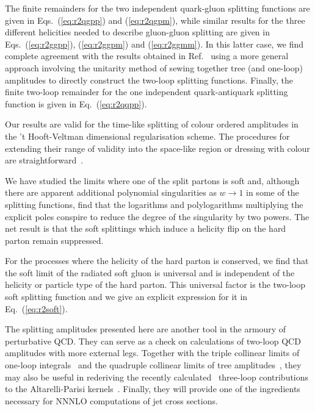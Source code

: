 \documentclass[paper,notoc,nohyper]{JHEP3}
\begin{document}
The finite remainders for the two independent quark-gluon splitting functions
are given in Eqs.~(\ref{eq:r2qgpp}) and (\ref{eq:r2qgpm}), while similar
results for the three different helicities needed to describe gluon-gluon
splitting  are given in Eqs.~(\ref{eq:r2ggpp}), (\ref{eq:r2ggpm}) and
(\ref{eq:r2ggmm}).  In this latter case, we find complete agreement with the
results obtained in Ref.~\cite{Bern:2lsplit} using a more general approach  
involving the unitarity method of sewing together tree (and one-loop)
amplitudes to directly construct the two-loop splitting functions.  Finally,
the finite two-loop remainder for the one independent quark-antiquark splitting
function is given in Eq.~(\ref{eq:r2qqpp}).

Our results are valid for the time-like splitting of colour
ordered amplitudes in the 't Hooft-Veltman dimensional regularisation
scheme.    The procedures for extending their range of validity into the
space-like region or dressing with colour are
straightforward~\cite{Bern:2lsplit}.

We have studied the limits where one of the split partons is soft and, although
there are apparent additional polynomial singularities as $w \to 1$ in some of
the splitting functions, find that the logarithms and polylogarithms
multiplying the explicit poles conspire to reduce the degree of the singularity
by two powers.   The net result is that the soft splittings which induce a
helicity flip on the hard parton remain suppressed.  

For the processes where the helicity of the hard parton is conserved, we find
that the soft limit of the radiated soft gluon is universal and is independent
of the helicity or particle type of the hard parton.  This universal factor is
the two-loop soft splitting function and we give an explicit expression for it
in Eq.~(\ref{eq:r2soft}).

The splitting amplitudes presented here are another tool in the armoury of perturbative QCD.
They can serve as a check on calculations of two-loop QCD amplitudes with more external
legs.   Together with the triple collinear limits of one-loop integrals~\cite{Catani:triplecoll}
 and the quadruple
collinear limits of tree amplitudes~\cite{DelDuca:treecoll}, 
they may also be useful in rederiving the  recently
calculated~\cite{Moch:nonsinglet,Vogt:singlet}  three-loop contributions to the
Altarelli-Parisi kernels~\cite{Kosower:evolker}.  Finally, they will provide one of the
ingredients necessary for NNNLO computations of jet cross sections. 
\end{document}
